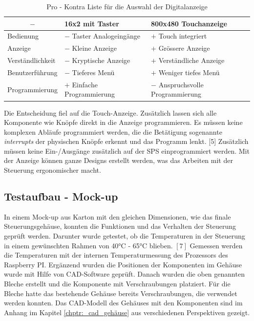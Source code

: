 \begin{table}[H]
    \centering
    \begin{tabular}{l|l|l}
        \multicolumn{1}{c|}{$-$}&        \textbf{16x2 mit Taster}&       \textbf{800x480 Touchanzeige}\\
        \hline
        Bedienung&                      $-$ Taster Analogeingänge&      $+$ Touch integriert\\
        Anzeige&                        $-$ Kleine Anzeige&             $+$ Grössere Anzeige\\
        Verständlichkeit&               $-$ Kryptische Anzeige&         $+$ Verständliche Anzeige\\
        Benutzerführung&                $-$ Tieferes Menü&              $+$ Weniger tiefes Menü\\
        Programmierung&                 $+$ Einfache Programmierung&    $-$ Anspruchsvolle Programmierung
    \end{tabular}
    \caption{Pro - Kontra Liste für die Auswahl der Digitalanzeige}
    \label{tab:choice_display_hw}
\end{table}

Die Entscheidung fiel auf die Touch-Anzeige. Zusätzlich lassen sich alle Komponente wie Knöpfe direkt in die Anzeige programmieren. Es müssen keine komplexen Abläufe programmiert werden, die die Betätigung sogenannte \textit{interrupts} der physischen Knöpfe erkennt und das Programm lenkt. [5] Zusätzlich müssen keine Ein-/Ausgänge zusätzlich auf der SPS einprogrammiert werden. Mit der Anzeige können ganze Designs erstellt werden, was das Arbeiten mit der Steuerung ergonomischer macht.

\subsection{Testaufbau - Mock-up}
In einem Mock-up aus Karton mit den gleichen Dimensionen, wie das finale Steuerungsgehäuse, konnten die Funktionen und das Verhalten der Steuerung geprüft werden. Darunter wurde getestet, ob die Temperaturen in der Steuerung in einem gewünschten Rahmen von 40°C - 65°C blieben. $[7]$ Gemessen werden die Temperaturen mit der internen Temperaturmessung des Prozessors des Raspberry PI. Ergänzend wurden die Positionen der Komponenten im Gehäuse wurde mit Hilfe von CAD-Software geprüft. Danach wurden die oben genannten Bleche erstellt und die Komponente mit Verschraubungen platziert. Für die Bleche hatte das bestehende Gehäuse bereits Verschraubungen, die verwendet werden konnten. Das CAD-Modell des Gehäuses mit den Komponenten sind im Anhang im Kapitel \ref{chptr:_cad_gehäuse} aus verschiedenen Perspektiven gezeigt.

